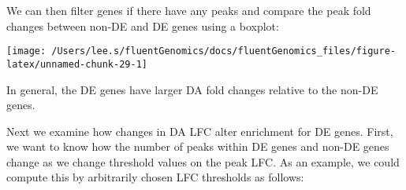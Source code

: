\documentclass[
  9pt,
  a4paper,
]{extarticle}
\newenvironment{Shaded}{\begin{snugshade}}{\end{snugshade}}
\newcommand{\DataTypeTok}[1]{\textcolor[rgb]{0.13,0.29,0.53}{#1}}
\newcommand{\DecValTok}[1]{\textcolor[rgb]{0.00,0.00,0.81}{#1}}
\newcommand{\KeywordTok}[1]{\textcolor[rgb]{0.13,0.29,0.53}{\textbf{#1}}}
\newcommand{\NormalTok}[1]{#1}
\newcommand{\OperatorTok}[1]{\textcolor[rgb]{0.81,0.36,0.00}{\textbf{#1}}}
\newcommand{\OtherTok}[1]{\textcolor[rgb]{0.56,0.35,0.01}{#1}}
\newcommand{\StringTok}[1]{\textcolor[rgb]{0.31,0.60,0.02}{#1}}
\begin{document}
We can then filter genes if there have any peaks and compare the peak fold
changes between non-DE and DE genes using a boxplot:

\begin{Shaded}
\end{Shaded}

\begin{center}\texttt{[image: /Users/lee.s/fluentGenomics/docs/fluentGenomics\_files/figure-latex/unnamed-chunk-29-1]} \end{center}

In general, the DE genes have larger DA fold changes relative to the non-DE
genes.

Next we examine how changes in DA LFC alter enrichment for DE genes. First, we
want to know how the number of peaks within DE genes and non-DE genes change as
we change threshold values on the peak LFC. As an example, we could compute
this by arbitrarily chosen LFC thresholds as follows:

\begin{Shaded}
\end{Shaded}
\end{document}
